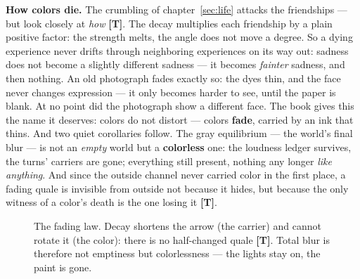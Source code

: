 \documentclass[11pt,letterpaper]{article}
\newcommand{\stT}{\textbf{[T]}\xspace}
\begin{document}
\textbf{How colors die.} The crumbling of chapter~\ref{sec:life}
attacks the friendships --- but look closely at \emph{how} \stT. The
decay multiplies each friendship by a plain positive factor: the
strength melts, the angle does not move a degree. So a dying
experience never drifts through neighboring experiences on its way
out: sadness does not become a slightly different sadness --- it
becomes \emph{fainter} sadness, and then nothing. An old photograph
fades exactly so: the dyes thin, and the face never changes
expression --- it only becomes harder to see, until the paper is
blank. At no point did the photograph show a different face. The
book gives this the name it deserves: colors do not distort ---
colors \textbf{fade}, carried by an ink that thins. And two quiet
corollaries follow. The gray equilibrium --- the world's final
blur --- is not an \emph{empty} world but a \textbf{colorless} one:
the loudness ledger survives, the turns' carriers are gone;
everything still present, nothing any longer \emph{like anything}.
And since the outside channel never carried color in the first
place, a fading quale is invisible from outside not because it
hides, but because the only witness of a color's death is the one
losing it \stT.

\begin{figure}[H]
\centering
{}
\caption{The fading law. Decay shortens the arrow (the carrier) and
cannot rotate it (the color): there is no half-changed quale \stT.
Total blur is therefore not emptiness but colorlessness --- the
lights stay on, the paint is gone.}
\label{fig:fading}
\end{figure}
\end{document}
